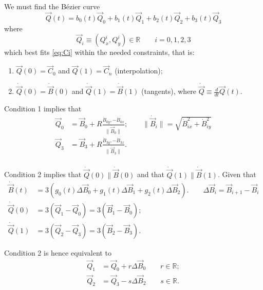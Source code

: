 \documentclass{scrartcl}
\newcommand\V[1]{\vec{#1}}
\newcommand\D[1]{\dot{#1}}
\newcommand\DV[1]{\D{\V{#1}}}
\begin{document}
We must find the Bézier curve
\begin{equation}\label{eq:q}
\V{Q}(t) = b_0(t) \V{Q}_0 + b_1(t) \V{Q}_1 + b_2(t) \V{Q}_2 + b_3(t) \V{Q}_3
\end{equation}
where
\begin{equation*}
\V{Q}_i \equiv ( Q^i_x, Q^i_y ) \in \mathbb{R} \qquad i = 0,1,2,3
\end{equation*}
which best fits \eqref{eq:Ci} within the needed constraints, that is:
\begin{enumerate}
\item $\V{Q}(0) = \V{C}_0$ and $\V{Q}(1) = \V{C}_n$ (interpolation);
\item $\DV{Q}(0) = \DV{B}(0)$ and $\DV{Q}(1) = \DV{B}(1)$ (tangents),
where $\DV{Q} \equiv \frac{d}{dt} \V{Q}(t)$.
\end{enumerate}

\medskip
Condition 1 implies that
\begin{equation}\label{eq:q03}
\begin{split}
    \V{Q}_0 &= \V{B}_0 + R \frac{\D{B}_{0y}, -\D{B}_{0x}}
	{\| \DV{B}_0 \|}; \qquad
	\| \DV{B}_i \| = \sqrt{\D{B}_{ix}^2 + \D{B}_{iy}^2} \\
    \V{Q}_3 &= \V{B}_3 + R \frac{\D{B}_{3y}, -\D{B}_{3x}}
	{\| \DV{B}_3 \|}. \\
\end{split}
\end{equation}

Condition 2 implies that $\DV{Q}(0) \parallel \DV{B}(0)$ and that
$\DV{Q}(1) \parallel \DV{B}(1)$.
Given that
\begin{equation}
\begin{split}
    \DV{B}(t) &= 3 \left(
	g_0(t) \Delta \V{B}_0 +
	g_1(t) \Delta \V{B}_1 +
	g_2(t) \Delta \V{B}_2
    \right). \qquad \Delta \V{B}_i = \V{B}_{i+1} - \V{B}_i \\
    \DV{Q}(0) &= 3 ( \V{Q}_1 - \V{Q}_0 ) = 3 ( \V{B}_1 - \V{B}_0 ); \\
    \DV{Q}(1) &= 3 ( \V{Q}_2 - \V{Q}_3 ) = 3 ( \V{B}_2 - \V{B}_3 ).
\end{split}
\end{equation}

Condition 2 is hence equivalent to
\begin{equation}\label{eq:q12}
\begin{split}
    \V{Q}_1 &= \V{Q}_0 + r \Delta \V{B}_0 \qquad r \in \mathbb{R}; \\
    \V{Q}_2 &= \V{Q}_3 - s \Delta \V{B}_2 \qquad s \in \mathbb{R}.
\end{split}
\end{equation}
\end{document}
